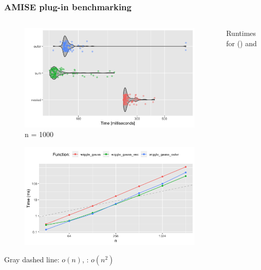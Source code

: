 \section{}
\begin{frame}
	\frametitle{AMISE plug-in benchmarking}
	\begin{columns}
		\begin{column}{0.48\textwidth}
			\setlength{\abovecaptionskip}{-3pt}
			\begin{figure}[H]
				\centering
				\includegraphics[width=0.95\linewidth]{../images/microbench}
				\caption{n = 1000}
				\label{fig:microbench}
			\end{figure}
			\begin{figure}[H]
				\centering
				\includegraphics[width=1\linewidth]{../images/runtime_wiggle}
				\caption{}
				\label{fig:runtimewiggle}
			\end{figure}
			Gray dashed line: $o(n)$, : $o(n^2)$
		\end{column}
		\begin{column}{0.48\textwidth}
			Runtimes for  () and 

\end{column}
\end{columns}
\end{frame}
